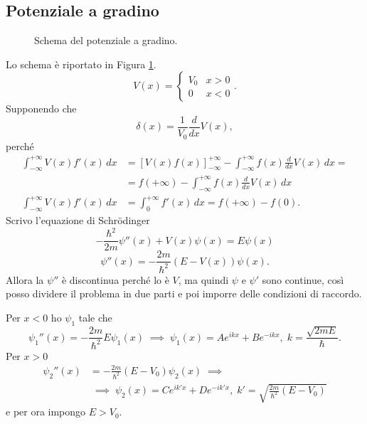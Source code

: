 \subsection{Potenziale a gradino}
\begin{figure}
\centering
{}
\caption{Schema del potenziale a gradino.}
\label{gradino}
\end{figure}
Lo schema è riportato in Figura \ref{gradino}.
\[
V(x) = \left\{ \begin{matrix}
V_0 & x > 0 \\
0 & x < 0
\end{matrix} \right..
\]
Supponendo che
\[
\delta(x) = \frac{1}{V_0} \frac{d}{dx} V(x),
\]
perché
\begin{align*}
\int_{-\infty}^{+\infty} V(x) f'(x) \, dx &= \left[ V(x) f(x) \right]_{-\infty}^{+\infty} - \int_{-\infty}^{+\infty} f(x) \frac{d}{dx}V(x) \, dx = \\
&= f(+\infty) - \int_{-\infty}^{+\infty} f(x) \frac{d}{dx}V(x) \, dx \\
\int_{-\infty}^{+\infty} V(x) f'(x) \, dx &= \int_0^{+\infty} f'(x) \, dx = f(+\infty) - f(0).
\end{align*}
Scrivo l'equazione di Schr\"odinger
\[
-\frac{\hbar^2}{2m} \psi''(x) + V(x) \psi(x) = E \psi(x)
\]
\[
\psi''(x) = -\frac{2m}{\hbar^2} (E - V(x)) \psi(x).
\]
Allora la \( \psi'' \) è discontinua perché lo è \( V \), ma quindi \( \psi \) e \( \psi' \) sono continue, così posso dividere il problema in due parti e poi imporre delle condizioni di raccordo.

\bigskip
\noindent
Per \( x < 0 \) ho \( \psi_1 \) tale che 
\[
\psi_1''(x) = -\frac{2m}{\hbar^2} E \psi_1(x) \; \implies \; \psi_1(x) = A e^{ikx} + B e^{-ikx}, \; k = \frac{\sqrt{2mE}}{\hbar}.
\]
Per \( x > 0 \)
\begin{align*}
\psi_2''(x) &= -\frac{2m}{\hbar^2} (E - V_0) \psi_2(x) \; \implies \\
&\; \implies \; \psi_2(x) = C e^{ik'x} + D e^{-ik'x}, \; k' = \sqrt{\frac{2m}{\hbar^2}(E - V_0)}
\end{align*}
e per ora impongo \( E > V_0 \).

